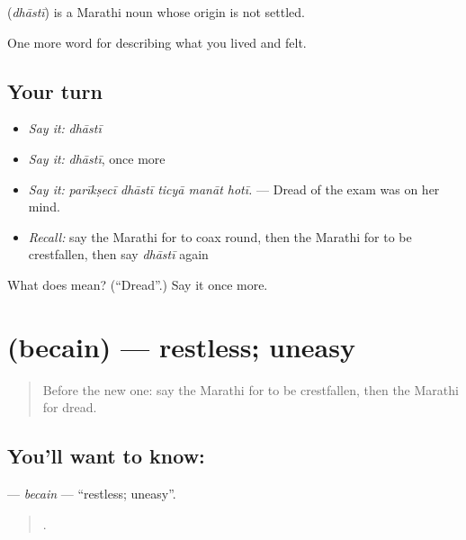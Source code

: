 \begin{cousinweb}
\textbf{} (\emph{dhāstī}) is a Marathi noun whose origin is not settled.
\end{cousinweb}

\begin{grammarlens}[title={What you've built}]
One more word for describing what you lived and felt.
\end{grammarlens}

\subsection*{Your turn}
\begin{itemize}
\raggedright
  \item \emph{Say it:} \emph{dhāstī}
  \item \emph{Say it:} \emph{dhāstī}, once more
  \item \emph{Say it:} \emph{parīkṣecī dhāstī ticyā manāt hotī.} — Dread of the exam was on her mind.
  \item \emph{Recall:} say the Marathi for to coax round, then the Marathi for to be crestfallen, then say \emph{dhāstī} again
\end{itemize}

\begin{tcolorbox}[breakable,colback=teal!4,colframe=teal!35!black,title={Before you move on}]
What does  mean? (\textquotedblleft{}Dread\textquotedblright{}.) Say it once more.
\end{tcolorbox}
\section[\texorpdfstring{\mr{बेचैन} (becain)}{बेचैन (becain)}]{ (becain) — restless; uneasy}

\label{lesson:MR-C455-becain}



\begin{quote}
Before the new one: say the Marathi for to be crestfallen, then the Marathi for dread.
\end{quote}

\subsection*{You'll want to know: }
\textbf{} — \emph{becain} — \textquotedblleft{}restless; uneasy\textquotedblright{}.

\begin{quote}
   .
\end{quote}

